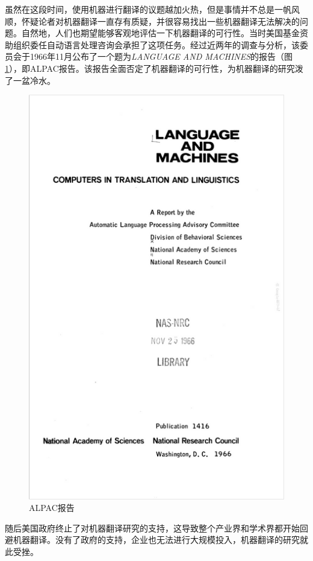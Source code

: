 \parinterval 虽然在这段时间，使用机器进行翻译的议题越加火热，但是事情并不总是一帆风顺，怀疑论者对机器翻译一直存有质疑，并很容易找出一些机器翻译无法解决的问题。自然地，人们也期望能够客观地评估一下机器翻译的可行性。当时美国基金资助组织委任自动语言处理咨询会承担了这项任务。经过近两年的调查与分析，该委员会于1966年11月公布了一个题为\emph{LANGUAGE AND MACHINES}的报告（图\ref{fig:1-5}），即ALPAC报告。该报告全面否定了机器翻译的可行性，为机器翻译的研究泼了一盆冷水。

\begin{figure}[htp]
    \centering
\includegraphics[scale=0.65]{./Chapter1/Figures/figure-report.jpg}
    \caption{ALPAC报告}
    \label{fig:1-5}
\end{figure}

\parinterval 随后美国政府终止了对机器翻译研究的支持，这导致整个产业界和学术界都开始回避机器翻译。没有了政府的支持，企业也无法进行大规模投入，机器翻译的研究就此受挫。


